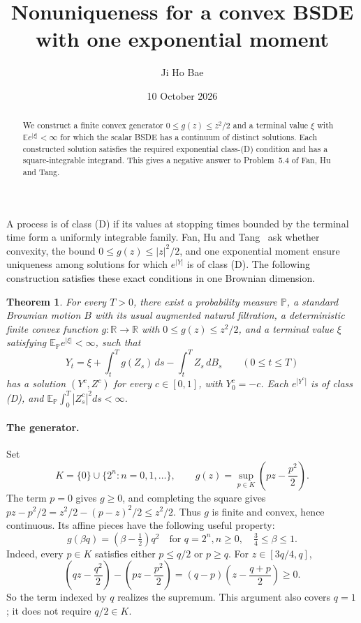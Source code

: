 \documentclass[11pt]{article}
\title{Nonuniqueness for a convex BSDE\protect\\ with one exponential moment}
\author{Ji Ho Bae}
\date{10 October 2026}
\newtheorem{theorem}{Theorem}
\begin{document}
\maketitle
\begin{abstract}
We construct a finite convex generator $0\leq g(z)\leq z^2/2$ and a terminal value $\xi$ with $\mathbb E e^{|\xi|}<\infty$ for which the scalar BSDE has a continuum of distinct solutions. Each constructed solution satisfies the required exponential class-(D) condition and has a square-integrable integrand. This gives a negative answer to Problem~5.4 of Fan, Hu and Tang.
\end{abstract}

A process is of class (D) if its values at stopping times bounded by the terminal time form a uniformly integrable family. Fan, Hu and Tang~\cite[Problem~5.4, equation~(5.3)]{FHT} ask whether convexity, the bound $0\leq g(z)\leq |z|^2/2$, and one exponential moment ensure uniqueness among solutions for which $e^{|Y|}$ is of class (D). The following construction satisfies these exact conditions in one Brownian dimension.

\begin{theorem}\label{thm:main}
For every $T>0$, there exist a probability measure $\mathbb P$, a standard Brownian motion $B$ with its usual augmented natural filtration, a deterministic finite convex function $g:\mathbb R\to\mathbb R$ with $0\leq g(z)\leq z^2/2$, and a terminal value $\xi$ satisfying $\mathbb E_{\mathbb P}e^{|\xi|}<\infty$, such that
\begin{equation}\label{eq:bsde}
 Y_t=\xi+\int_t^T g(Z_s)\,ds-\int_t^T Z_s\,dB_s
 \qquad(0\leq t\leq T)
\end{equation}
has a solution $(Y^c,Z^c)$ for every $c\in[0,1]$, with $Y^c_0=-c$. Each $e^{|Y^c|}$ is of class (D), and $\mathbb E_{\mathbb P}\int_0^T|Z^c_s|^2ds<\infty$.
\end{theorem}

\paragraph{The generator.}
Set
\begin{equation}\label{eq:generator}
 K=\{0\}\cup\{2^n:n=0,1,\ldots\},\qquad
 g(z)=\sup_{p\in K}\left(pz-\frac{p^2}{2}\right).
\end{equation}
The term $p=0$ gives $g\geq0$, and completing the square gives
$pz-p^2/2=z^2/2-(p-z)^2/2\leq z^2/2$. Thus $g$ is finite and convex, hence continuous. Its affine pieces have the following useful property:
\begin{equation}\label{eq:face}
 g(\beta q)=(\beta-\tfrac12)q^2
 \quad\text{for }q=2^n, n\geq0,\quad \tfrac34\leq\beta\leq1.
\end{equation}
Indeed, every $p\in K$ satisfies either $p\leq q/2$ or $p\geq q$. For $z\in[3q/4,q]$,
\[
 \left(qz-\frac{q^2}{2}\right)-
 \left(pz-\frac{p^2}{2}\right)
 =(q-p)\left(z-\frac{q+p}{2}\right)\geq0.
\]
So the term indexed by $q$ realizes the supremum. This argument also covers $q=1$; it does not require $q/2\in K$.
\end{document}
